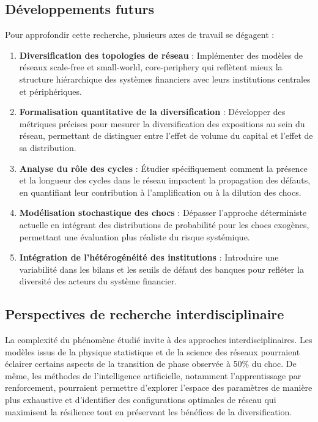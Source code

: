 \subsection{Développements futurs}\label{subsec:developpements-futurs}

Pour approfondir cette recherche, plusieurs axes de travail se dégagent :
\begin{enumerate}
    \item \textbf{Diversification des topologies de réseau} : Implémenter des modèles de réseaux scale-free et small-world, core-periphery qui reflètent mieux la structure hiérarchique des systèmes financiers avec leurs institutions centrales et périphériques.

    \item \textbf{Formalisation quantitative de la diversification} : Développer des métriques précises pour mesurer la diversification des expositions au sein du réseau, permettant de distinguer entre l'effet de volume du capital et l'effet de sa distribution.

    \item \textbf{Analyse du rôle des cycles} : Étudier spécifiquement comment la présence et la longueur des cycles dans le réseau impactent la propagation des défauts, en quantifiant leur contribution à l'amplification ou à la dilution des chocs.

    \item \textbf{Modélisation stochastique des chocs} : Dépasser l'approche déterministe actuelle en intégrant des distributions de probabilité pour les chocs exogènes, permettant une évaluation plus réaliste du risque systémique.

    \item \textbf{Intégration de l'hétérogénéité des institutions} : Introduire une variabilité dans les bilans et les seuils de défaut des banques pour refléter la diversité des acteurs du système financier.
\end{enumerate}

\subsection{Perspectives de recherche interdisciplinaire}\label{subsec:perspectives-de-recherche-interdisciplinaire}

La complexité du phénomène étudié invite à des approches interdisciplinaires.
Les modèles issus de la physique statistique et de la science des réseaux pourraient éclairer certains aspects de la transition de phase observée à 50\% du choc.
De même, les méthodes de l'intelligence artificielle, notamment l'apprentissage par renforcement, pourraient permettre d'explorer l'espace des paramètres de manière plus exhaustive et d'identifier des configurations optimales de réseau qui maximisent la résilience tout en préservant les bénéfices de la diversification.

